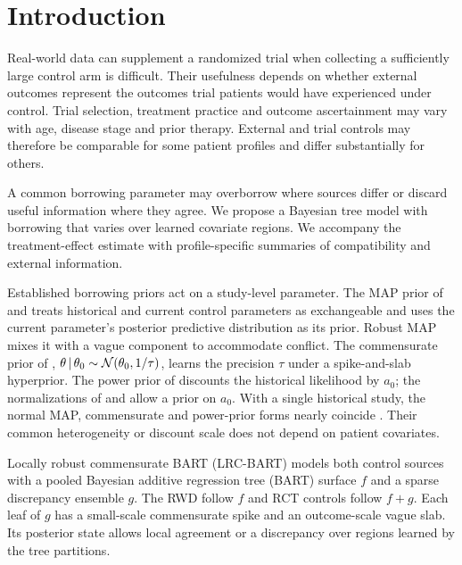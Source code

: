 \doublespacing

\section{Introduction}
\label{sec:intro}

Real-world data can supplement a randomized trial when collecting a sufficiently large control arm is difficult. Their usefulness depends on whether external outcomes represent the outcomes trial patients would have experienced under control. Trial selection, treatment practice and outcome ascertainment may vary with age, disease stage and prior therapy. External and trial controls may therefore be comparable for some patient profiles and differ substantially for others.

A common borrowing parameter may overborrow where sources differ or discard useful information where they agree. We propose a Bayesian tree model with borrowing that varies over learned covariate regions. We accompany the treatment-effect estimate with profile-specific summaries of compatibility and external information.

Established borrowing priors act on a study-level parameter. The MAP prior of \citet{Neuenschwander2010MAP} and \citet{schmidli2014robust} treats historical and current control parameters as exchangeable and uses the current parameter's posterior predictive distribution as its prior. Robust MAP mixes it with a vague component to accommodate conflict. The commensurate prior of \citet{Hobbs2011,Hobbs2012}, $\theta\,\vert\,\theta_0\sim\mathcal{N}(\theta_0,1/\tau)$, learns the precision $\tau$ under a spike-and-slab hyperprior. The power prior of \citet{IbrahimChen2000} discounts the historical likelihood by $a_0$; the normalizations of \citet{Duan2006} and \citet{Neuenschwander2009PP} allow a prior on $a_0$. With a single historical study, the normal MAP, commensurate and power-prior forms nearly coincide \citep{RoverFriede2020,RoverFriede2025}. Their common heterogeneity or discount scale does not depend on patient covariates.

Locally robust commensurate BART (LRC-BART) models both control sources with a pooled Bayesian additive regression tree (BART) surface $f$ and a sparse discrepancy ensemble $g$. The RWD follow $f$ and RCT controls follow $f+g$. Each leaf of $g$ has a small-scale commensurate spike and an outcome-scale vague slab. Its posterior state allows local agreement or a discrepancy over regions learned by the tree partitions.


